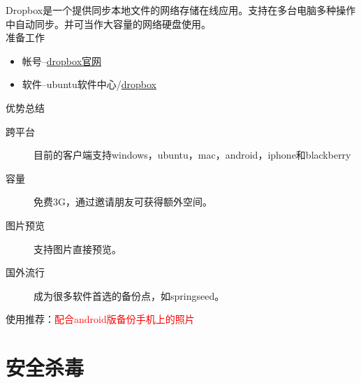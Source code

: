 Dropbox是一个提供同步本地文件的网络存储在线应用。支持在多台电脑多种操作中自动同步。并可当作大容量的网络硬盘使用。\\
准备工作
\begin{itemize}
\item 帐号--\href{https://www.dropbox.com/}{dropbox官网}
\item 软件--ubuntu软件中心/\href{https://www.dropbox.com/install2}{dropbox}
\end{itemize} 
优势总结
\begin{description}
\item[跨平台] 目前的客户端支持windows，ubuntu，mac，android，iphone和blackberry
\item[容量] 免费3G，通过邀请朋友可获得额外空间。
\item[图片预览] 支持图片直接预览。
\item[国外流行] 成为很多软件首选的备份点，如springseed。
\end{description}
使用推荐：\textcolor{red}{配合android版备份手机上的照片}


\clearpage
\section{安全杀毒}
















